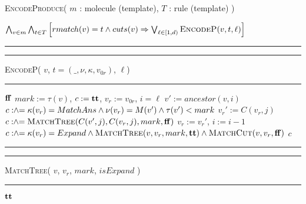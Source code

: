 \setlength{\textfloatsep}{0pt}%
\begin{algorithm}[t]
  \caption{\textsc{EncodeProduce}( $m$ : molecule (template), $T$ : rule (template) )}
  \label{alg:produce}
  \begin{algorithmic}[1]
    \State \Return $
    \bigwedge_{v\in m}
    \bigwedge_{t \in T}
    \left[
      rmatch(v) = t \land cuts(v) \Rightarrow \bigvee_{ {\ell \in [1,d)}} \textsc{EncodeP}( v, t, \ell)
      \right]
      $
  \end{algorithmic}
  \hrule
  \vspace{1ex}
  \hrule\vspace{2pt}
  \textsc{EncodeP}( $v$, $t = (\_,\nu,\kappa,v_{0r})$, $\ell$)\hfill\mbox{}
  \vspace{2pt}\hrule
  \begin{algorithmic}[1]
     \quad \Return $\mathbf{ff}$
    \EndIf
    \State $mark := \tau(v)$,\; $c := \mathbf{tt}$, \; $v_r := v_{0r}$, \; $i = \ell$
    \label{line:encodep-while}
    \State $v' := ancestor(v,i)$
    \State $c \mathrel{:\hspace{-3pt}\land\hspace{-3pt}=}  \kappa(v_r) = MatchAns \land \nu(v_r) = M(v') \land \tau(v') < mark$
    \label{line:encodep-ans-match}
    \label{line:encodep-sub-for-loop}
       \label{line:encodep-jth-child-cond}
       \State $v_r' := C(v_r, j)$ 
       \label{line:encodep-next-vr}
    \Else
       \State $c \mathrel{:\hspace{-3pt}\land\hspace{-3pt}=} \textsc{MatchTree}(C(v',j), C(v_r, j),mark, \mathbf{ff})$
       \label{line:mtree}
    \EndIf
    \EndFor
    \State $v_r := v_r'$,\; $i := i - 1$
    \label{line:encodep-update-vr}
    \EndWhile
    \label{line:encodep-end-whileloop}
    \State $c \mathrel{:\hspace{-3pt}\land\hspace{-3pt}=}  \kappa(v_r) = Expand \land \textsc{MatchTree}(v, v_r,mark,\mathbf{tt}) \land \textsc{MatchCut}(v, v_r,\mathbf{ff})$
    \label{line:encodep-vr-expand}
    \State \Return $c$
  \end{algorithmic}
  \hrule
  \vspace{1ex}
  \hrule\vspace{2pt}
  \textsc{MatchTree}( $v$, $v_r$, $mark$, $isExpand$ )\hfill\mbox{}
  \vspace{2pt}\hrule
  \begin{algorithmic}[1]
     \Return $\mathbf{tt}$ \EndIf
    \label{line:matchtree-vr-absent}

\end{algorithmic}
\end{algorithm}
